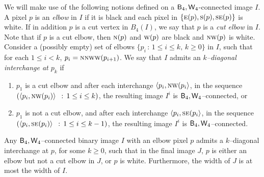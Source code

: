 \documentclass[lotsofwhite,charterfonts]{patmorin}
\newcommand{\fourfour}{\ensuremath{\protect\textup{\textsf{B}}_{4},\protect\textup{\textsf{W}}_{4}}}
\newcommand{\N}{\textsc{n}}
\newcommand{\E}{\textsc{e}}
\newcommand{\SE}{\textsc{se}}
\renewcommand{\S}{\textsc{s}}
\newcommand{\W}{\textsc{w}}
\newcommand{\NW}{\textsc{nw}}
\newcommand{\ic}[2]{\langle #1,#2 \rangle}
\begin{document}
We will make use of the following notions defined on a
\fourfour-connected image $I$. A pixel $p$ is an \emph{elbow} in $I$
if it is black and each pixel in $\{\E(p), \S(p), \SE(p)\}$ is white.
If in addition $p$ is a cut vertex in $B_4(I)$, we say that $p$ is a
\emph{cut elbow} in $I$. Note that if $p$ is a cut elbow, then $\N(p)$
and $\W(p)$ are black and $\NW(p)$ is white. Consider a (possibly
empty) set of elbows $\{p_i\, :\, 1\leq i\leq k, \, k\geq 0\}$ in $I$,
such that for each $1\leq i< k$, $p_i=\N\N\W\W(p_{i+1})$. We say that
$I$ admits an \emph{$k$--diagonal interchange at $p_k$} if 



\begin{enumerate}
\item $p_1$ is a cut elbow and after each interchange $\ic{p_i}{\NW(p_i}$, in the sequence  $(\ic{p_i}{\NW(p_i)}\,\ :\, 1\leq i\leq k)$, the resulting image $I^i$ is $\fourfour$--connected, or

\item $p_1$ is not a cut elbow, and after each interchange $\ic{p_i}{\SE(p_i}$, in the sequence  $(\ic{p_i}{\SE(p_i)}\,\ :\, 1\leq i\leq k-1)$, the resulting image $I^i$ is $\fourfour$--connected.
\end{enumerate}

\begin{lem}
Any \fourfour--connected binary image $I$ with an elbow pixel $p$ admits a $k$--diagonal interchange at $p$, for some $k\geq 0$, such that in the final image $J$, $p$ is either an elbow but not a cut elbow in $J$, or $p$ is white. Furthermore, the width of $J$ is at most the width of $I$. 
\end{lem}
\end{document}
